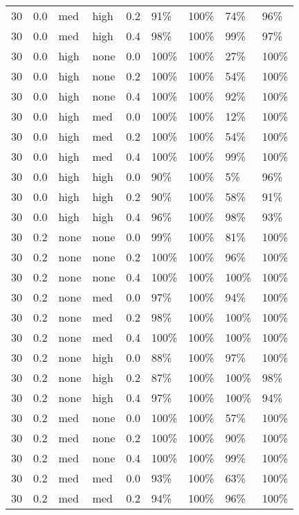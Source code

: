 \begin{longtable}{rrllrllll}
  30 & 0.0 & med & high & 0.2 & 91\% & 100\% & 74\% & 96\% \\ 
  30 & 0.0 & med & high & 0.4 & 98\% & 100\% & 99\% & 97\% \\ 
  30 & 0.0 & high & none & 0.0 & 100\% & 100\% & 27\% & 100\% \\ 
  30 & 0.0 & high & none & 0.2 & 100\% & 100\% & 54\% & 100\% \\ 
  30 & 0.0 & high & none & 0.4 & 100\% & 100\% & 92\% & 100\% \\ 
  30 & 0.0 & high & med & 0.0 & 100\% & 100\% & 12\% & 100\% \\ 
  30 & 0.0 & high & med & 0.2 & 100\% & 100\% & 54\% & 100\% \\ 
  30 & 0.0 & high & med & 0.4 & 100\% & 100\% & 99\% & 100\% \\ 
  30 & 0.0 & high & high & 0.0 & 90\% & 100\% & 5\% & 96\% \\ 
  30 & 0.0 & high & high & 0.2 & 90\% & 100\% & 58\% & 91\% \\ 
  30 & 0.0 & high & high & 0.4 & 96\% & 100\% & 98\% & 93\% \\ 
  30 & 0.2 & none & none & 0.0 & 99\% & 100\% & 81\% & 100\% \\ 
  30 & 0.2 & none & none & 0.2 & 100\% & 100\% & 96\% & 100\% \\ 
  30 & 0.2 & none & none & 0.4 & 100\% & 100\% & 100\% & 100\% \\ 
  30 & 0.2 & none & med & 0.0 & 97\% & 100\% & 94\% & 100\% \\ 
  30 & 0.2 & none & med & 0.2 & 98\% & 100\% & 100\% & 100\% \\ 
  30 & 0.2 & none & med & 0.4 & 100\% & 100\% & 100\% & 100\% \\ 
  30 & 0.2 & none & high & 0.0 & 88\% & 100\% & 97\% & 100\% \\ 
  30 & 0.2 & none & high & 0.2 & 87\% & 100\% & 100\% & 98\% \\ 
  30 & 0.2 & none & high & 0.4 & 97\% & 100\% & 100\% & 94\% \\ 
  30 & 0.2 & med & none & 0.0 & 100\% & 100\% & 57\% & 100\% \\ 
  30 & 0.2 & med & none & 0.2 & 100\% & 100\% & 90\% & 100\% \\ 
  30 & 0.2 & med & none & 0.4 & 100\% & 100\% & 99\% & 100\% \\ 
  30 & 0.2 & med & med & 0.0 & 93\% & 100\% & 63\% & 100\% \\ 
  30 & 0.2 & med & med & 0.2 & 94\% & 100\% & 96\% & 100\% \\ 

\end{longtable}
